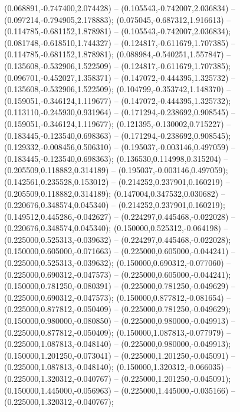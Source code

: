  (0.068891,-0.747400,2.074428) -- (0.105543,-0.742007,2.036834) -- (0.097214,-0.794905,2.178883);
 (0.075045,-0.687312,1.916613) -- (0.114785,-0.681152,1.878981) -- (0.105543,-0.742007,2.036834);
 (0.081748,-0.618510,1.744327) -- (0.124817,-0.611679,1.707385) -- (0.114785,-0.681152,1.878981);
 (0.088984,-0.540251,1.557847) -- (0.135608,-0.532906,1.522509) -- (0.124817,-0.611679,1.707385);
 (0.096701,-0.452027,1.358371) -- (0.147072,-0.444395,1.325732) -- (0.135608,-0.532906,1.522509);
 (0.104799,-0.353742,1.148370) -- (0.159051,-0.346124,1.119677) -- (0.147072,-0.444395,1.325732);
 (0.113110,-0.245930,0.931964) -- (0.171294,-0.238692,0.908545) -- (0.159051,-0.346124,1.119677);
 (0.121395,-0.130002,0.715227) -- (0.183445,-0.123540,0.698363) -- (0.171294,-0.238692,0.908545);
 (0.129332,-0.008456,0.506310) -- (0.195037,-0.003146,0.497059) -- (0.183445,-0.123540,0.698363);
 (0.136530,0.114998,0.315204) -- (0.205509,0.118882,0.314189) -- (0.195037,-0.003146,0.497059);
 (0.142561,0.235528,0.153012) -- (0.214252,0.237901,0.160219) -- (0.205509,0.118882,0.314189);
 (0.147004,0.347532,0.030682) -- (0.220676,0.348574,0.045340) -- (0.214252,0.237901,0.160219);
 (0.149512,0.445286,-0.042627) -- (0.224297,0.445468,-0.022028) -- (0.220676,0.348574,0.045340);
 (0.150000,0.525312,-0.064198) -- (0.225000,0.525313,-0.039632) -- (0.224297,0.445468,-0.022028);
 (0.150000,0.605000,-0.071663) -- (0.225000,0.605000,-0.044241) -- (0.225000,0.525313,-0.039632);
 (0.150000,0.690312,-0.077060) -- (0.225000,0.690312,-0.047573) -- (0.225000,0.605000,-0.044241);
 (0.150000,0.781250,-0.080391) -- (0.225000,0.781250,-0.049629) -- (0.225000,0.690312,-0.047573);
 (0.150000,0.877812,-0.081654) -- (0.225000,0.877812,-0.050409) -- (0.225000,0.781250,-0.049629);
 (0.150000,0.980000,-0.080850) -- (0.225000,0.980000,-0.049913) -- (0.225000,0.877812,-0.050409);
 (0.150000,1.087813,-0.077979) -- (0.225000,1.087813,-0.048140) -- (0.225000,0.980000,-0.049913);
 (0.150000,1.201250,-0.073041) -- (0.225000,1.201250,-0.045091) -- (0.225000,1.087813,-0.048140);
 (0.150000,1.320312,-0.066035) -- (0.225000,1.320312,-0.040767) -- (0.225000,1.201250,-0.045091);
 (0.150000,1.445000,-0.056963) -- (0.225000,1.445000,-0.035166) -- (0.225000,1.320312,-0.040767);
